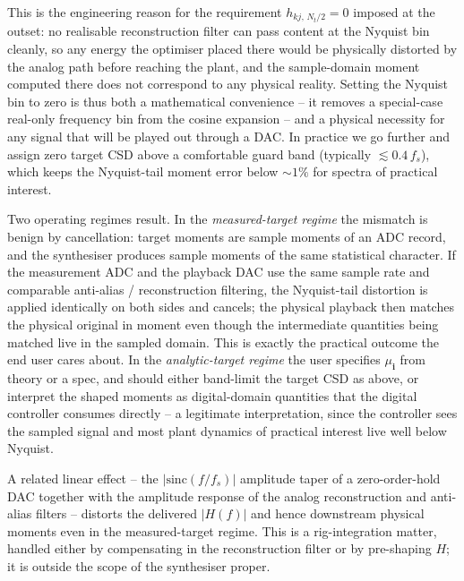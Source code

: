 \documentclass[10pt,a4paper]{article}
\numberwithin{equation}{section}
\newcommand{\mat}[1]{\left(#1\right)}
\newcommand{\m}[1]{\mathrm{#1}}
\begin{document}
This is the engineering reason for the requirement $h_{k j,\, N_t/2} = 0$ imposed at the outset: no realisable reconstruction filter can pass content at the Nyquist bin cleanly, so any energy the optimiser placed there would be physically distorted by the analog path before reaching the plant, and the sample-domain moment computed there does not correspond to any physical reality. Setting the Nyquist bin to zero is thus both a mathematical convenience -- it removes a special-case real-only frequency bin from the cosine expansion -- and a physical necessity for any signal that will be played out through a DAC. In practice we go further and assign zero target CSD above a comfortable guard band (typically $\lesssim 0.4\, f_s$), which keeps the Nyquist-tail moment error below ${\sim}1\%$ for spectra of practical interest.

Two operating regimes result. In the \emph{measured-target regime} the mismatch is benign by cancellation: target moments are sample moments of an ADC record, and the synthesiser produces sample moments of the same statistical character. If the measurement ADC and the playback DAC use the same sample rate and comparable anti-alias / reconstruction filtering, the Nyquist-tail distortion is applied identically on both sides and cancels; the physical playback then matches the physical original in moment even though the intermediate quantities being matched live in the sampled domain. This is exactly the practical outcome the end user cares about. In the \emph{analytic-target regime} the user specifies $\mu_\mathbf{i}$ from theory or a spec, and should either band-limit the target CSD as above, or interpret the shaped moments as digital-domain quantities that the digital controller consumes directly -- a legitimate interpretation, since the controller sees the sampled signal and most plant dynamics of practical interest live well below Nyquist.

A related linear effect -- the $|\m{sinc}\mat{f/f_s}|$ amplitude taper of a zero-order-hold DAC together with the amplitude response of the analog reconstruction and anti-alias filters -- distorts the delivered $|H\mat{f}|$ and hence downstream physical moments even in the measured-target regime. This is a rig-integration matter, handled either by compensating in the reconstruction filter or by pre-shaping $H$; it is outside the scope of the synthesiser proper.

\end{document}
